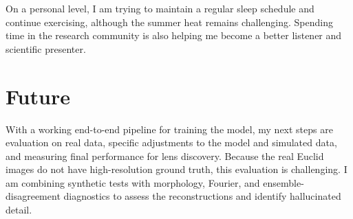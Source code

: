 \documentclass[11pt,a4paper]{article}
\begin{document}
On a personal level, I am trying to maintain a regular sleep schedule and continue exercising, although the summer heat remains challenging. Spending time in the research community is also helping me become a better listener and scientific presenter.

\section{Future}

With a working end-to-end pipeline for training the model, my next steps are evaluation on real data, specific adjustments to the model and simulated data, and measuring final performance for lens discovery. Because the real Euclid images do not have high-resolution ground truth, this evaluation is challenging. I am combining synthetic tests with morphology, Fourier, and ensemble-disagreement diagnostics to assess the reconstructions and identify hallucinated detail.

\printbibliography
\end{document}
